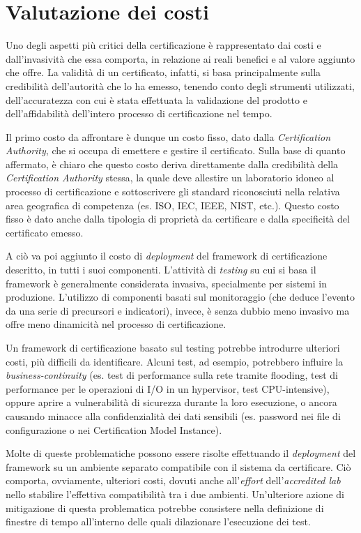 \documentclass[../main.tex]{subfiles}
\begin{document}
\section{Valutazione dei costi}
Uno degli aspetti più critici della certificazione è rappresentato dai costi e dall'invasività che essa comporta, in relazione ai reali benefici e al valore aggiunto che offre.
La validità di un certificato, infatti, si basa principalmente sulla credibilità dell'autorità che lo ha emesso, tenendo conto degli strumenti utilizzati, dell'accuratezza con cui è stata effettuata la validazione del prodotto e dell'affidabilità dell'intero processo di certificazione nel tempo.

Il primo costo da affrontare è dunque un costo fisso, dato dalla \textit{Certification Authority}, che si occupa di emettere e gestire il certificato.
Sulla base di quanto affermato, è chiaro che questo costo deriva direttamente dalla credibilità della \textit{Certification Authority} stessa, la quale deve allestire un laboratorio idoneo al processo di certificazione e sottoscrivere gli standard riconosciuti nella relativa area geografica di competenza (es. ISO, IEC, IEEE, NIST, etc.).
Questo costo fisso è dato anche dalla tipologia di proprietà da certificare e dalla specificità del certificato emesso.

A ciò va poi aggiunto il costo di \textit{deployment} del framework di certificazione descritto, in tutti i suoi componenti.
L'attività di \textit{testing} su cui si basa il framework è generalmente considerata invasiva, specialmente per sistemi in produzione.
L'utilizzo di componenti basati sul monitoraggio (che deduce l'evento da una serie di precursori e indicatori), invece, è senza dubbio meno invasivo ma offre meno dinamicità nel processo di certificazione.

Un framework di certificazione basato sul testing potrebbe introdurre ulteriori costi, più difficili da identificare.
Alcuni test, ad esempio, potrebbero influire la \textit{business-continuity} (es. test di performance sulla rete tramite flooding, test di performance per le operazioni di I/O in un hypervisor, test CPU-intensive), oppure aprire a vulnerabilità di sicurezza durante la loro esecuzione, o ancora causando minacce alla confidenzialità dei dati sensibili (es. password nei file di configurazione o nei Certification Model Instance).

Molte di queste problematiche possono essere risolte effettuando il \textit{deployment} del framework su un ambiente separato compatibile con il sistema da certificare.
Ciò comporta, ovviamente, ulteriori costi, dovuti anche all'\textit{effort} dell'\textit{accredited lab} nello stabilire l'effettiva compatibilità tra i due ambienti. 
Un'ulteriore azione di mitigazione di questa problematica potrebbe consistere nella definizione di finestre di tempo all'interno delle quali dilazionare l'esecuzione dei test.
\end{document}
